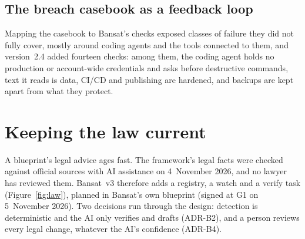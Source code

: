 \documentclass[11pt,a4paper]{article}
\begin{document}
\subsection{The breach casebook as a feedback loop}
Mapping the casebook to Bansat's checks exposed classes of failure they did not fully cover, mostly around coding agents
and the tools connected to them, and version~2.4 added fourteen checks: among them, the coding agent holds no production
or account-wide credentials and asks before destructive commands, text it reads is data, CI/CD and publishing are
hardened, and backups are kept apart from what they protect.

\section{Keeping the law current}\label{sec:law}

A blueprint's legal advice ages fast. The framework's legal facts were checked against official sources with AI
assistance on 4~November 2026, and no lawyer has reviewed them. Bansat~v3 therefore adds a registry, a watch and a verify
task (Figure~\ref{fig:law}), planned in Bansat's own blueprint (signed at G1 on 5~November 2026). Two decisions run through the design: detection is deterministic and the AI
only verifies and drafts (ADR-B2), and a person reviews every legal change, whatever the AI's confidence (ADR-B4).
\end{document}
